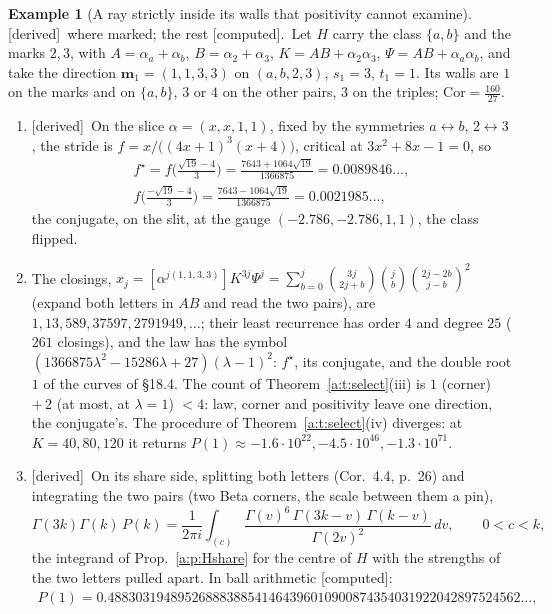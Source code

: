 \documentclass[11pt]{article}
\newcommand{\mvec}{\mathbf m}
\theoremstyle{plain}
\theoremstyle{definition}
\newtheorem{example}[proposition]{Example}
\theoremstyle{remark}
\newcommand{\derived}{\textup{[derived]}}
\newcommand{\computed}{\textup{[computed]}}
\begin{document}
\begin{example}[A ray strictly inside its walls that positivity cannot examine]\label{b:e:Hslit}\derived\ where marked; the rest \computed.\
Let $H$ carry the class $\{a,b\}$ and the marks $2,3$, with $A=\alpha_a+\alpha_b$, $B=\alpha_2+\alpha_3$, $K=AB+\alpha_2\alpha_3$, $\Psi=AB+\alpha_a\alpha_b$, and take the direction $\mvec_1=(1,1,3,3)$ on $(a,b,2,3)$, $s_1=3$, $t_1=1$. Its walls are $1$ on the marks and on $\{a,b\}$, $3$ or $4$ on the other pairs, $3$ on the triples; $\mathrm{Cor}=\frac{160}{27}$.
\begin{enumerate}[label=(\roman*)]
\item \derived\ On the slice $\alpha=(x,x,1,1)$, fixed by the symmetries $a\leftrightarrow b$, $2\leftrightarrow3$, the stride is $f=x/\big((4x+1)^3(x+4)\big)$, critical at $3x^2+8x-1=0$, so
\begin{gather*}
f^\star=f\Big(\tfrac{\sqrt{19}-4}3\Big)=\frac{7643+1064\sqrt{19}}{1366875}=0.0089846\ldots,\\
f\Big(\tfrac{-\sqrt{19}-4}3\Big)=\frac{7643-1064\sqrt{19}}{1366875}=0.0021985\ldots,
\end{gather*}
the conjugate, on the slit, at the gauge $(-2.786,-2.786,1,1)$, the class flipped.
\item The closings, $x_j=[\alpha^{j(1,1,3,3)}]K^{3j}\Psi^j=\sum_{b=0}^j\binom{3j}{2j+b}\binom jb\binom{2j-2b}{j-b}^2$ (expand both letters in $AB$ and read the two pairs), are $1,13,589,37597,2791949,\dots$; their least recurrence has order $4$ and degree $25$ ($261$ closings), and the law has the symbol $(1366875\lambda^2-15286\lambda+27)(\lambda-1)^2$: $f^\star$, its conjugate, and the double root $1$ of the curves of \S18.4. The count of Theorem~\ref{a:t:select}(iii) is $1$ (corner) $+\,2$ (at most, at $\lambda=1$) $<4$: law, corner and positivity leave one direction, the conjugate's. The procedure of Theorem~\ref{a:t:select}(iv) diverges: at $K=40,80,120$ it returns $P(1)\approx-1.6\cdot10^{22},-4.5\cdot10^{46},-1.3\cdot10^{71}$.
\item \derived\ On its share side, splitting both letters (Cor.~4.4, p.~26) and integrating the two pairs (two Beta corners, the scale between them a pin),
\[
\Gamma(3k)\Gamma(k)\,P(k)=\frac1{2\pi i}\int_{(c)}\frac{\Gamma(v)^6\,\Gamma(3k-v)\,\Gamma(k-v)}{\Gamma(2v)^2}\,dv,\qquad0<c<k,
\]
the integrand of Prop.~\ref{a:p:Hshare} for the centre of $H$ with the strengths of the two letters pulled apart. In ball arithmetic \computed:
\begin{gather*}
P(1)=0.48830319489526888388541464396010900874354031922042897524562\ldots,\\

\end{gather*}
\end{enumerate}
\end{example}
\end{document}
